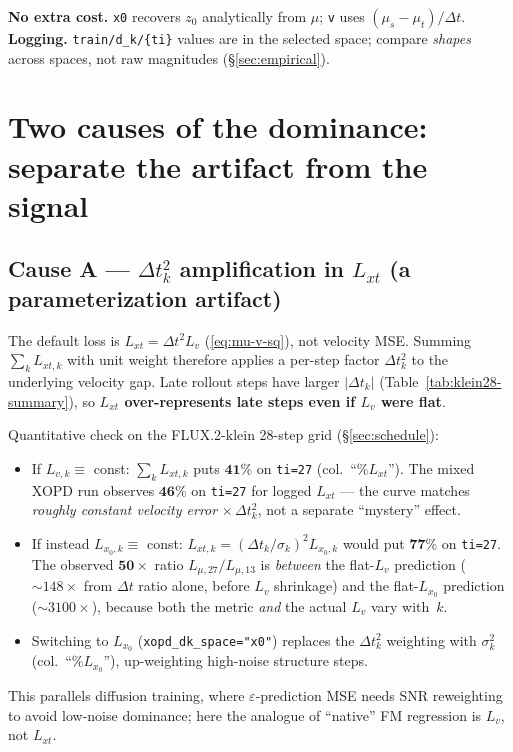 \documentclass[11pt,a4paper]{article}
\newcommand{\dt}{\Delta t}
\begin{document}
\textbf{No extra cost.} \texttt{x0} recovers $z_0$ analytically from $\mu$; \texttt{v} uses
$(\mu_s-\mu_t)/\dt$. \textbf{Logging.} \texttt{train/d\_k/\{ti\}} values are in the selected space;
compare \emph{shapes} across spaces, not raw magnitudes (\S\ref{sec:empirical}).

\section{Two causes of the dominance: separate the artifact from the signal}
\label{sec:causes}

\subsection{Cause A --- $\dt_k^2$ amplification in $L_{xt}$ (a parameterization artifact)}
\label{ssec:causeA}

The default loss is $L_{xt}=\dt^2 L_v$ (\eqref{eq:mu-v-sq}), not velocity MSE. Summing
$\sum_k L_{xt,k}$ with unit weight therefore applies a per-step factor $\dt_k^2$ to the underlying
velocity gap. Late rollout steps have larger $\lvert\dt_k\rvert$ (Table~\ref{tab:klein28-summary}),
so \textbf{$L_{xt}$ over-represents late steps even if $L_v$ were flat}.

Quantitative check on the FLUX.2-klein 28-step grid (\S\ref{sec:schedule}):
\begin{itemize}[leftmargin=1.5em]
\item If $L_{v,k}\equiv$ const: $\sum_k L_{xt,k}$ puts $\mathbf{41\%}$ on \texttt{ti=27}
(col.~``\%$L_{xt}$''). The mixed XOPD run observes $\mathbf{46\%}$ on \texttt{ti=27} for logged
$L_{xt}$ --- the curve matches \emph{roughly constant velocity error} $\times\,\dt_k^2$, not a
separate ``mystery'' effect.
\item If instead $L_{x_0,k}\equiv$ const: $L_{xt,k}=(\dt_k/\sigma_k)^2 L_{x_0,k}$ would put
$\mathbf{77\%}$ on \texttt{ti=27}. The observed $\mathbf{50\times}$ ratio $L_{\mu,27}/L_{\mu,13}$
is \emph{between} the flat-$L_v$ prediction ($\sim148\times$ from $\dt$ ratio alone, before
$L_v$ shrinkage) and the flat-$L_{x_0}$ prediction ($\sim3100\times$), because both the metric
\emph{and} the actual $L_v$ vary with~$k$.
\item Switching to $L_{x_0}$ (\texttt{xopd\_dk\_space="x0"}) replaces the $\dt_k^2$ weighting with
$\sigma_k^2$ (col.~``\%$L_{x_0}$''), up-weighting high-noise structure steps.
\end{itemize}
This parallels diffusion training, where $\varepsilon$-prediction MSE needs SNR reweighting to avoid
low-noise dominance; here the analogue of ``native'' FM regression is $L_v$, not $L_{xt}$.
\end{document}
